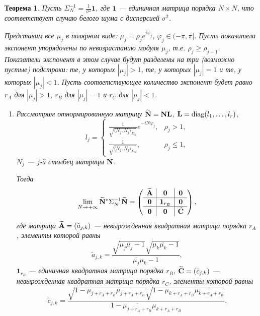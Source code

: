 \documentclass[12pt,a4paper]{article}
\def\diag{\mathop{\mathrm{diag}}}
\newtheorem{theorem}{Теорема}
\begin{document}
\begin{theorem} \label{th:wninconsistency}
	Пусть $\Sigma_N^{-1} = \frac{1}{\sigma^2}{\mathbf{1}}$, где $\mathbf{1}$ --- единичная матрица порядка $N \times N$, что соответствует случаю белого шума с дисперсией $\sigma^2$.
	
	Представим все $\mu_j$ в полярном виде: $\mu_j = \rho_j e^{i \varphi_j}$, $\varphi_j \in (-\pi, \pi]$. Пусть показатели экспонент упорядочены по невозрастанию модуля $\mu_j$, т.е. $\rho_j \ge \rho_{j+1}$. Показатели экспонент в этом случае будут разделены на три (возможно пустые) подстроки: те, у которых $|\mu_j|>1$, те, у которых $|\mu_j| = 1$ и те, у которых $|\mu_j| < 1$. Пусть соответствующее количество экспонент будет равно $r_A$ для $|\mu_j|>1$, $r_B$ для $|\mu_j|=1$ и $r_C$ для $|\mu_j|<1$.
	\begin{enumerate}
		\item Рассмотрим отнормированную матрицу $\widetilde {\mathbf{N}} = \mathbf{N} \mathbf{L}$, $\bfL = \diag(l_1, \ldots, l_r)$, 
		\begin{equation*}
		l_j = \begin{cases}
		\frac{1}{\sqrt{\langle N_j, N_j \rangle_{\Sigma_N}}} e^{-i N \varphi_j}, & \rho_j > 1, \\
		\frac{1}{\sqrt{\langle N_j, N_j \rangle_{\Sigma_N}}}, & \rho_j \le 1,
		\end{cases}
		\end{equation*}
		$N_j$ --- $j$-й столбец матрицы $\mathbf{N}$.
		
		Тогда \begin{equation*}
		\lim_{N \to + \infty} \widetilde {\mathbf{N}}^* \Sigma_N^{-1} \widetilde {\mathbf{N}} = \left( \begin{array}{c|c|c}
		\widetilde {\mathbf{A}} & \mathbf{0} & \mathbf{0} \\ \hline
		\mathbf{0} & \mathbf{1}_{r_B} & \mathbf{0} \\ \hline
		\mathbf{0} & \mathbf{0} & \widetilde {\mathbf{C}}
		\end{array}  \right),
		\end{equation*}
		где матрица $\widetilde {\mathbf{A}} = (\tilde a_{j, k})$ --- невырожденная квадратная матрица порядка $r_A$, элементы которой равны
		\begin{equation*}
		\tilde a_{j, k} = \frac{\sqrt{\mu_j \overline{\mu_j} - 1}\sqrt{\mu_k \overline{\mu_k} - 1}}{\overline{\mu_j} \mu_k - 1},
		\end{equation*}
		$\mathbf{1}_{r_B}$ --- единичная квадратная матрица порядка $r_B$, $\widetilde {\mathbf{C}} = (\tilde c_{j, k})$ --- невырожденная квадратная матрица порядка $r_C$, элементы которой равны
		\begin{equation*}
		\tilde c_{j, k} = \frac{\sqrt{1 - \mu_{j+r_A+r_B} \overline{\mu_{j+r_A+r_B}}}\sqrt{1 - \mu_{k+r_A+r_B} \overline{\mu_{k+r_A+r_B}}}}{1 - \overline{\mu_{j+r_A+r_B}} \mu_{k+r_A+r_B}}.
	    \end{equation*}
	    

\end{enumerate}
\end{theorem}
\end{document}

